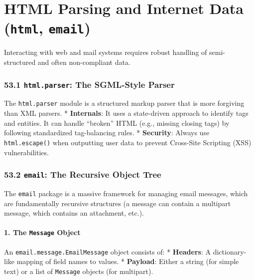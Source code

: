 \hypertarget{html-parsing-and-internet-data-html-email}{%
\chapter{\texorpdfstring{HTML Parsing and Internet Data (\texttt{html},
\texttt{email})}{HTML Parsing and Internet Data (html, email)}}\label{html-parsing-and-internet-data-html-email}}

Interacting with web and mail systems requires robust handling of
semi-structured and often non-compliant data.

\hypertarget{html.parser-the-sgml-style-parser}{%
\subsection{\texorpdfstring{53.1 \texttt{html.parser}: The SGML-Style
Parser}{53.1 html.parser: The SGML-Style Parser}}\label{html.parser-the-sgml-style-parser}}

The \passthrough{\lstinline!html.parser!} module is a structured markup
parser that is more forgiving than XML parsers. * \textbf{Internals}: It
uses a state-driven approach to identify tags and entities. It can
handle ``broken'' HTML (e.g., missing closing tags) by following
standardized tag-balancing rules. * \textbf{Security}: Always use
\passthrough{\lstinline!html.escape()!} when outputting user data to
prevent Cross-Site Scripting (XSS) vulnerabilities.

\hypertarget{email-the-recursive-object-tree}{%
\subsection{\texorpdfstring{53.2 \texttt{email}: The Recursive Object
Tree}{53.2 email: The Recursive Object Tree}}\label{email-the-recursive-object-tree}}

The \passthrough{\lstinline!email!} package is a massive framework for
managing email messages, which are fundamentally recursive structures (a
message can contain a multipart message, which contains an attachment,
etc.).

\hypertarget{the-message-object}{%
\subsubsection{\texorpdfstring{1. The \texttt{Message}
Object}{1. The Message Object}}\label{the-message-object}}

An \passthrough{\lstinline!email.message.EmailMessage!} object consists
of: * \textbf{Headers}: A dictionary-like mapping of field names to
values. * \textbf{Payload}: Either a string (for simple text) or a list
of \passthrough{\lstinline!Message!} objects (for multipart).

